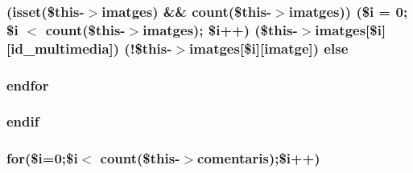 \subsubsection[{else}]{(isset(\$this-\/$>$imatges) \&\& count(\$this-\/$>$imatges)) (\$i = 0; \$i $<$ count(\$this-\/$>$imatges); \$i++) (\$this-\/$>$imatges\mbox{[}\$i\mbox{]}\mbox{[}\textquotesingle{}id\+\_\+multimedia\textquotesingle{}\mbox{]}) (!\$this-\/$>$imatges\mbox{[}\$i\mbox{]}\mbox{[}\textquotesingle{}imatge\textquotesingle{}\mbox{]}) else}\label{site_8php_a9110d517276b004ff722e2e05ebdf1c1}
\hypertarget{site_8php_ae8fdc27183f296411bac00ed522ee1ac}{}
\subsubsection[{endfor}]{\setlength{\rightskip}{0pt plus 5cm}endfor}\label{site_8php_ae8fdc27183f296411bac00ed522ee1ac}
\hypertarget{site_8php_a82cd33ca97ff99f2fcc5e9c81d65251b}{}
\subsubsection[{endif}]{\setlength{\rightskip}{0pt plus 5cm}endif}\label{site_8php_a82cd33ca97ff99f2fcc5e9c81d65251b}
\hypertarget{site_8php_a885711913d29ae0d9a5992ad9d7c7410}{}
\subsubsection[{for}]{\setlength{\rightskip}{0pt plus 5cm}for(\$i=0;\$i$<$ count(\$this-\/$>$comentaris);\$i++)}\label{site_8php_a885711913d29ae0d9a5992ad9d7c7410}
